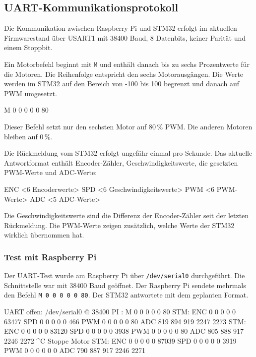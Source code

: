 \subsection{UART-Kommunikationsprotokoll}
Die Kommunikation zwischen Raspberry Pi und STM32 erfolgt im aktuellen Firmwarestand über USART1 mit 38400 Baud, 8 Datenbits, keiner Parität und einem Stoppbit.

 Ein Motorbefehl beginnt mit \texttt{M} und enthält danach bis zu sechs Prozentwerte für die Motoren. Die Reihenfolge entspricht den sechs Motorausgängen. Die Werte werden im STM32 auf den Bereich von -100 bis 100 begrenzt und danach auf PWM umgesetzt.

\begin{codeblock}
M 0 0 0 0 0 80
\end{codeblock}

Dieser Befehl setzt nur den sechsten Motor auf 80\,\% PWM. Die anderen Motoren bleiben auf 0\,\%.

Die Rückmeldung vom STM32 erfolgt ungefähr einmal pro Sekunde. Das aktuelle Antwortformat enthält Encoder-Zähler, Geschwindigkeitswerte, die gesetzten PWM-Werte und ADC-Werte:

\begin{codeblock}
ENC <6 Encoderwerte> SPD <6 Geschwindigkeitswerte>
PWM <6 PWM-Werte> ADC <5 ADC-Werte>
\end{codeblock}

Die Geschwindigkeitswerte sind die Differenz der Encoder-Zähler seit der letzten Rückmeldung. Die PWM-Werte zeigen zusätzlich, welche Werte der STM32 wirklich übernommen hat.


\subsubsection{Test mit Raspberry Pi}
Der UART-Test wurde am Raspberry Pi über \texttt{/dev/serial0} durchgeführt. Die Schnittstelle war mit 38400 Baud geöffnet. Der Raspberry Pi sendete mehrmals den Befehl \texttt{M 0 0 0 0 0 80}. Der STM32 antwortete mit dem geplanten Format.

\begin{codeblock}
UART offen: /dev/serial0 @ 38400
PI : M 0 0 0 0 0 80
STM: ENC 0 0 0 0 0 63477 SPD 0 0 0 0 0 466
     PWM 0 0 0 0 0 80 ADC 819 894 919 2247 2273
STM: ENC 0 0 0 0 0 83120 SPD 0 0 0 0 0 3938
     PWM 0 0 0 0 0 80 ADC 805 888 917 2246 2272
^C
Stoppe Motor
STM: ENC 0 0 0 0 0 87039 SPD 0 0 0 0 0 3919
     PWM 0 0 0 0 0 0 ADC 790 887 917 2246 2271
\end{codeblock}

